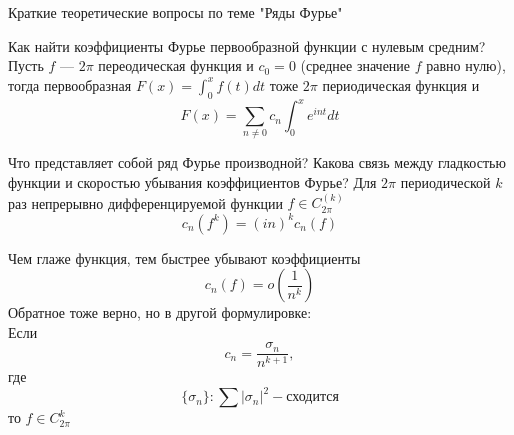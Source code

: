 \documentclass{article}
\begin{document}
\begin{section}{Краткие теоретические вопросы по теме "Ряды Фурье"}
\begin{subsection}{Как найти коэффициенты Фурье первообразной функции с нулевым средним?}
Пусть $ f $ ---  $ 2\pi $ переодическая функция и $ c_0 = 0 $ (среднее значение $f$ равно нулю), тогда первообразная $ F(x) = \int_{0}^{x}f(t)dt $ тоже $ 2\pi $ периодическая функция и 
\[ F(x) = \sum_{n \neq 0}c_n \int_{0}^{x} e^{int}dt \]
\end{subsection}

\begin{subsection}{Что представляет собой ряд Фурье производной? Какова связь между гладкостью функции и скоростью убывания коэффициентов Фурье?}
Для $ 2\pi $ периодической $ k $ раз непрерывно дифференцируемой функции $ f \in C_{2\pi}^{(k)} $
\[ c_n(f^{k}) = (in)^k c_n(f)  \]

Чем глаже функция, тем быстрее убывают коэффициенты 
\[ c_n(f) = o\left(\frac{1}{n^k}\right)\]
Обратное тоже верно, но в другой формулировке:\\
Если
\[ c_n = \frac{\sigma_n}{n^{k+1}}, \]
где \[ \{\sigma_n\}: \sum |\sigma_n|^2 - \text{сходится}  \]
то $f \in C_{2\pi}^k$
\end{subsection}

\end{section}
\end{document}
